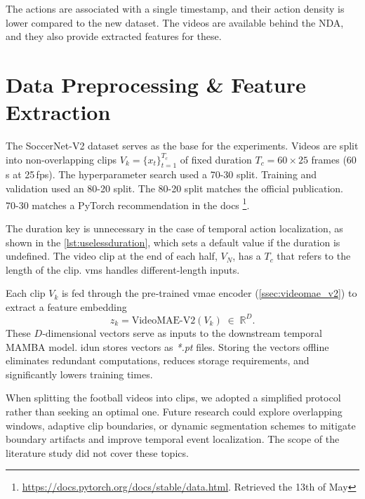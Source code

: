 The actions are associated with a single timestamp, and their action density is lower compared to the new dataset. The videos are available behind the NDA, and they also provide extracted features for these. 

\section{Data Preprocessing \& Feature Extraction}
\label{sec:preprocessing}

The SoccerNet-V2 dataset \cite{deliege_soccernet-v2_dataset_2021} serves as the base for the experiments. Videos are split into non-overlapping clips $V_k=\{x_t\}_{t=1}^{T_c}$ of fixed duration $T_c=60\!\times\!25$ frames (60\,s at 25\,fps). The hyperparameter search used a 70-30 split. Training and validation used an 80-20 split. The 80-20 split matches the official publication. 70-30 matches a PyTorch recommendation in the docs \footnote{\url{https://docs.pytorch.org/docs/stable/data.html}. Retrieved the 13th of May}.



The duration key is unnecessary in the case of temporal action localization, as shown in the \autoref{lst:uselessduration}, which sets a default value if the duration is undefined. The video clip at the end of each half, $V_{N}$, has a $T_c$ that refers to the length of the clip. \acrfull{vms} handles different-length inputs. 



Each clip $V_k$ is fed through the pre‐trained \acrshort{vmae} encoder (\cref{ssec:videomae_v2}) to extract a feature embedding
\[
z_k = \mathrm{VideoMAE\text{-}V2}(V_k)\;\in\;\mathbb{R}^D.
\]
These $D$‐dimensional vectors serve as inputs to the downstream temporal MAMBA model. \acrshort{idun} stores vectors as \textit{*.pt} files. Storing the vectors offline eliminates redundant computations, reduces storage requirements, and significantly lowers training times. 

When splitting the football videos into clips, we adopted a simplified protocol rather than seeking an optimal one. Future research could explore overlapping windows, adaptive clip boundaries, or dynamic segmentation schemes to mitigate boundary artifacts and improve temporal event localization. The scope of the literature study did not cover these topics.

